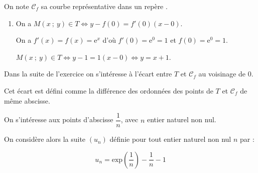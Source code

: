 On note $\mathcal{C}_f$ sa courbe représentative dans un repère \Oij.

\medskip

\begin{enumerate}
\item 
On a $M(x~;~y) \in T \iff y - f(0) = f'(0)(x - 0)$.

On a $f'(x) = f(x) = \text{e}^x$ d'où $f'(0) = \text{e}^0  = 1$ et $f(0) = \text{e}^0  = 1$.

$M(x~;~y) \in T \iff y - 1 = 1 (x - 0) \iff y = x + 1$.
\end{enumerate}

Dans la suite de l'exercice on s'intéresse à l'écart entre $T$ et $\mathcal{C}_f$ au voisinage de $0$. 

Cet écart est défini comme la différence des ordonnées des points de $T$ et $\mathcal{C}_f$ de même abscisse.

On s'intéresse aux points d'abscisse $\dfrac{1}{n}$, avec $n$ entier naturel non nul.

On considère alors la suite $\left(u_n\right)$ définie pour tout entier naturel non nul $n$ par : 

\[u_n = \text{exp} \left(\dfrac{1}{n}\right) - \dfrac{1}{n} - 1\]

